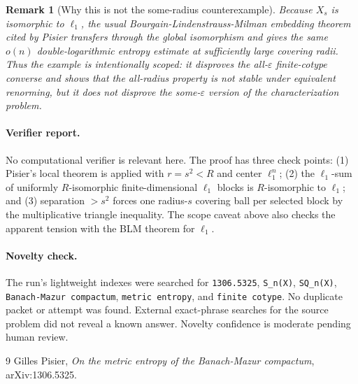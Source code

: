 \documentclass[11pt]{article}
\newtheorem{remark}{Remark}
\newcommand{\eps}{\varepsilon}
\begin{document}
\begin{remark}[Why this is not the some-radius counterexample]
Because $X_s$ is isomorphic to $\ell_1$, the usual
Bourgain-Lindenstrauss-Milman embedding theorem cited by Pisier transfers
through the global isomorphism and gives the same $o(n)$ double-logarithmic
entropy estimate at sufficiently large covering radii.  Thus the example is
intentionally scoped: it disproves the all-$\eps$ finite-cotype converse and
shows that the all-radius property is not stable under equivalent renorming,
but it does not disprove the some-$\eps$ version of the characterization
problem.
\end{remark}

\paragraph{Verifier report.}
No computational verifier is relevant here.  The proof has three check points:
(1) Pisier's local theorem is applied with $r=s^2<R$ and center $\ell_1^n$;
(2) the $\ell_1$-sum of uniformly $R$-isomorphic finite-dimensional
$\ell_1$ blocks is $R$-isomorphic to $\ell_1$; and (3) separation $>s^2$
forces one radius-$s$ covering ball per selected block by the multiplicative
triangle inequality.  The scope caveat above also checks the apparent tension
with the BLM theorem for $\ell_1$.

\paragraph{Novelty check.}
The run's lightweight indexes were searched for \texttt{1306.5325},
\texttt{S\_n(X)}, \texttt{SQ\_n(X)}, \texttt{Banach-Mazur compactum},
\texttt{metric entropy}, and \texttt{finite cotype}.  No duplicate packet or
attempt was found.  External exact-phrase searches for the source problem did
not reveal a known answer.  Novelty confidence is moderate pending human
review.

\begin{thebibliography}{9}
Gilles Pisier,
\emph{On the metric entropy of the Banach-Mazur compactum},
arXiv:1306.5325.
\end{thebibliography}
\end{document}
